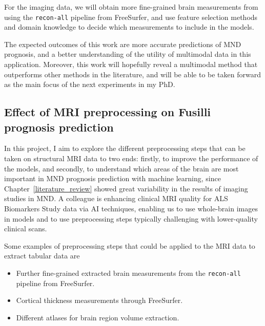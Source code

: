 For the imaging data, we will obtain more fine-grained brain measurements from using the \texttt{recon-all} pipeline from FreeSurfer, and use feature selection methods and domain knowledge to decide which measurements to include in the models.

The expected outcomes of this work are more accurate predictions of MND prognosis, and a better understanding of the utility of multimodal data in this application.
Moreover, this work will hopefully reveal a multimodal method that outperforms other methods in the literature, and will be able to be taken forward as the main focus of the next experiments in my PhD.

\subsection{Effect of MRI preprocessing on Fusilli prognosis prediction}


In this project, I aim to explore the different preprocessing steps that can be taken on structural MRI data to two ends: firstly, to improve the performance of the models, and secondly, to understand which areas of the brain are most important in MND prognosis prediction with machine learning, since Chapter~\ref{literature_review} showed great variability in the results of imaging studies in MND.
A colleague is enhancing clinical MRI quality for ALS Biomarkers Study data via AI techniques, enabling us to use whole-brain images in models and to use preprocessing steps typically challenging with lower-quality clinical scans.

Some examples of preprocessing steps that could be applied to the MRI data to extract tabular data are
\begin{itemize}
\setlength\itemsep{-0.5em}
    \item Further fine-grained extracted brain measurements from the \texttt{recon-all} pipeline from FreeSurfer.
    \item Cortical thickness measurements through FreeSurfer.
    \item Different atlases for brain region volume extraction.
\end{itemize}

